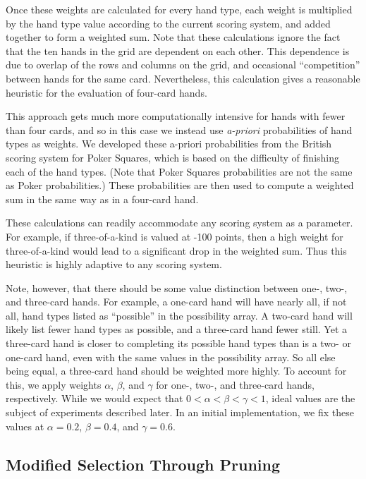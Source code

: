 \documentclass[letterpaper]{article}
\begin{document}
Once these weights are calculated for every hand type, each weight is multiplied by the hand type value according to the current scoring system, and added together to form a weighted sum. Note that these calculations ignore the fact that the ten hands in the grid are dependent on each other. This dependence is due to overlap of the rows and columns on the grid, and occasional ``competition'' between hands for the same card. Nevertheless, this calculation gives a reasonable heuristic for the evaluation of four-card hands.

This approach gets much more computationally intensive for hands with fewer than four cards, and so in this case we instead use {\it a-priori} probabilities of hand types as weights. We developed these a-priori probabilities from the British scoring system for Poker Squares, which is based on the difficulty of finishing each of the hand types. (Note that Poker Squares probabilities are not the same as Poker probabilities.) These probabilities are then used to compute a weighted sum in the same way as in a four-card hand.

These calculations can readily accommodate any scoring system as a parameter. For example, if three-of-a-kind is valued at -100 points, then a high weight for three-of-a-kind would lead to a significant drop in the weighted sum. Thus this heuristic is highly adaptive to any scoring system.

Note, however, that there should be some value distinction between one-, two-, and three-card hands. For example, a one-card hand will have nearly all, if not all, hand types listed as ``possible'' in the possibility array. A two-card hand will likely list fewer hand types as possible, and a three-card hand fewer still. Yet a three-card hand is closer to completing its possible hand types than is a two- or one-card hand, even with the same values in the possibility array. So all else being equal, a three-card hand should be weighted more highly. To account for this, we apply weights $\alpha$, $\beta$, and $\gamma$ for one-, two-, and three-card hands, respectively. While we would expect that $0 < \alpha < \beta < \gamma < 1$, ideal values are the subject of  experiments described later. In an initial implementation, we fix these values at $\alpha = 0.2$, $\beta = 0.4$, and $\gamma = 0.6$.

\subsection{Modified Selection Through Pruning}
\end{document}
